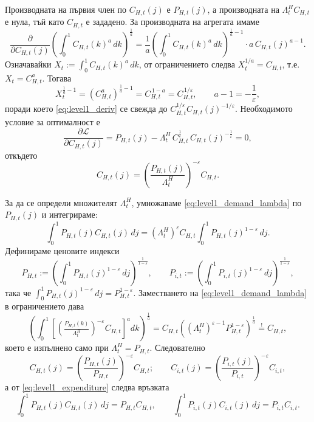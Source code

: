 Производната на първия член по $C_{H,t}(j)$ е $P_{H,t}(j)$, а производната на $\Lambda^{H}_t C_{H,t}$ е нула, тъй като $C_{H,t}$ е зададено. За производната на агрегата имаме
\begin{equation}
\frac{\partial}{\partial C_{H,t}(j)} \left( \int_0^1 C_{H,t}(k)^{a}\, dk \right)^{\frac{1}{a}}
= \frac{1}{a} \left( \int_0^1 C_{H,t}(k)^{a}\, dk \right)^{\frac{1}{a}-1} \cdot a\, C_{H,t}(j)^{a-1}.
\label{eq:level1_deriv}
\end{equation}
Означавайки $X_t := \int_0^1 C_{H,t}(k)^{a}\, dk$, от ограничението следва $X_t^{1/a} = C_{H,t}$, т.е. $X_t = C_{H,t}^{a}$. Тогава
\[
X_t^{\frac{1}{a}-1} = \left( C_{H,t}^{a} \right)^{\frac{1}{a}-1} = C_{H,t}^{\,1-a} = C_{H,t}^{\,1/\varepsilon},
\qquad
a - 1 = -\frac{1}{\varepsilon},
\]
поради което \eqref{eq:level1_deriv} се свежда до $C_{H,t}^{1/\varepsilon} C_{H,t}(j)^{-1/\varepsilon}$. Необходимото условие за оптималност е
\begin{equation}
\frac{\partial \mathcal{L}}{\partial C_{H,t}(j)}
= P_{H,t}(j) - \Lambda^{H}_t\, C_{H,t}^{\frac{1}{\varepsilon}}\, C_{H,t}(j)^{-\frac{1}{\varepsilon}} = 0,
\label{eq:level1_foc}
\end{equation}
откъдето
\begin{equation}
C_{H,t}(j) = \left( \frac{P_{H,t}(j)}{\Lambda^{H}_t} \right)^{-\varepsilon} C_{H,t}.
\label{eq:level1_demand_lambda}
\end{equation}

За да се определи множителят $\Lambda^{H}_t$, умножаваме \eqref{eq:level1_demand_lambda} по $P_{H,t}(j)$ и интегрираме:
\begin{equation}
\int_0^1 P_{H,t}(j) C_{H,t}(j)\, dj
= \left( \Lambda^{H}_t \right)^{\varepsilon} C_{H,t} \int_0^1 P_{H,t}(j)^{1-\varepsilon}\, dj.
\label{eq:level1_expenditure}
\end{equation}
Дефинираме ценовите индекси
\begin{equation}
P_{H,t} := \left( \int_0^1 P_{H,t}(j)^{1-\varepsilon}\, dj \right)^{\frac{1}{1-\varepsilon}},
\qquad
P_{i,t} := \left( \int_0^1 P_{i,t}(j)^{1-\varepsilon}\, dj \right)^{\frac{1}{1-\varepsilon}},
\label{eq:PH_index}
\end{equation}
така че $\int_0^1 P_{H,t}(j)^{1-\varepsilon}\, dj = P_{H,t}^{1-\varepsilon}$. Заместването на \eqref{eq:level1_demand_lambda} в ограничението дава
\[
\left( \int_0^1 \left[ \left( \tfrac{P_{H,t}(k)}{\Lambda^{H}_t} \right)^{-\varepsilon} C_{H,t} \right]^{a} dk \right)^{\frac{1}{a}}
= C_{H,t} \left( \left( \Lambda^{H}_t \right)^{\varepsilon - 1} P_{H,t}^{1-\varepsilon} \right)^{\frac{1}{a}} \overset{!}{=} C_{H,t},
\]
което е изпълнено само при $\Lambda^{H}_t = P_{H,t}$. Следователно
\begin{equation}
C_{H,t}(j) = \left( \frac{P_{H,t}(j)}{P_{H,t}} \right)^{-\varepsilon} C_{H,t};
\qquad
C_{i,t}(j) = \left( \frac{P_{i,t}(j)}{P_{i,t}} \right)^{-\varepsilon} C_{i,t},
\label{eq:demand_variety}
\end{equation}
а от \eqref{eq:level1_expenditure} следва връзката
\begin{equation}
\int_0^1 P_{H,t}(j) C_{H,t}(j)\, dj = P_{H,t} C_{H,t},
\qquad
\int_0^1 P_{i,t}(j) C_{i,t}(j)\, dj = P_{i,t} C_{i,t}.
\label{eq:expenditure_variety}
\end{equation}

